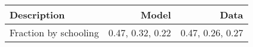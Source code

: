 \begin{tabular}{lrr}
\hline
Description & Model  & Data  \\ 
\hline
Fraction by schooling & 0.47, 0.32, 0.22  & 0.47, 0.26, 0.27  \\ 
\hline
\end{tabular}%
